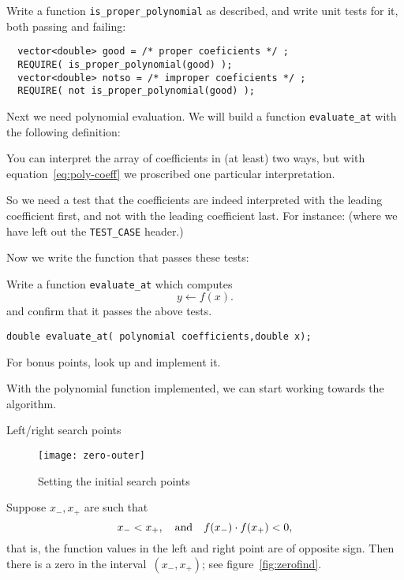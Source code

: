 \begin{exercise}
  \label{ex:proper-poly}
  Write a function \lstinline+is_proper_polynomial+ as described,
  and write unit tests for it, both passing and failing:
\begin{lstlisting}
  vector<double> good = /* proper coeficients */ ;
  REQUIRE( is_proper_polynomial(good) );
  vector<double> notso = /* improper coeficients */ ;
  REQUIRE( not is_proper_polynomial(good) );
\end{lstlisting}
\end{exercise}

Next we need polynomial evaluation.
We will build a function \lstinline{evaluate_at} with the
following definition:

You can interpret the array of coefficients in
(at least) two ways, but with equation~\eqref{eq:poly-coeff}
we proscribed one particular interpretation.

So we need a  test that the coefficients are
indeed interpreted with the leading coefficient first,
and not with the leading coefficient last.
For instance:
%
%
(where we have left out the \lstinline+TEST_CASE+ header.)

Now we write the function that passes these tests:

\begin{exercise}
  \label{ex:bisect-eval}
  Write a function \lstinline+evaluate_at+ which computes
  \[ y \leftarrow f(x) . \]
  and confirm that it passes the above tests.
\begin{lstlisting}
double evaluate_at( polynomial coefficients,double x);
\end{lstlisting}
  For bonus points, look up 
  and implement it.
\end{exercise}

With the polynomial function implemented,
we can start working towards the algorithm.

 {Left/right search points}

\begin{figure}[ht]
  \texttt{[image: zero-outer]}
  \caption{Setting the initial search points}
  \label{fig:zero-outer}
\end{figure}

Suppose $x_-,x_+$ are such that 
\[ x_-<x_+,\quad\hbox{and}\quad f(x_-)\cdot f(x_+)<0,\]
that is, the function values in the left and right point are of opposite sign.
Then there is a zero in the interval~$(x_-,x_+)$;
see figure~\ref{fig:zerofind}.

